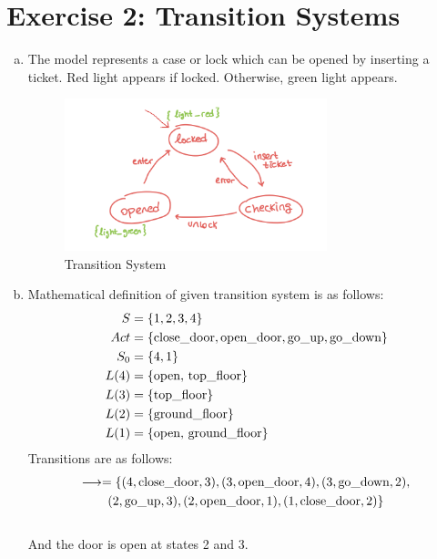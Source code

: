 \documentclass{article}
\begin{document}
\section*{Exercise 2: Transition Systems}
\begin{enumerate}[(a)]
    \item{The model represents a case or lock which can be opened by inserting a ticket. Red light appears if locked. Otherwise, green light appears.}
    \begin{figure}[!htb]
        \centering
        \includegraphics[width=3in]{images/2a.png}
        \caption{Transition System}
        \label{fig:2a}
    \end{figure}

    \item{Mathematical definition of given transition system is as follows:}
        \begin{equation*}
        \centering
            \begin{split}
                S &= \{1,2,3,4\} \\
                Act &= \{\text{close\textunderscore door}, \text{open\textunderscore door}, \text{go\textunderscore up}, \text{go\textunderscore down}\}\\
                S_0 &= \{4, 1\}\\
                L(4) &= \{\text{open, top\textunderscore floor}\}\\
                L(3) &= \{\text{top\textunderscore floor}\}\\
                L(2) &= \{\text{ground\textunderscore floor}\}\\
                L(1) &= \{\text{open, ground\textunderscore floor}\}\\
            \end{split}
        \end{equation*}
        Transitions are as follows:\\
        \begin{multline*}
        \longrightarrow = \{
        (4, \text{close\textunderscore door}, 3), (3, \text{open\textunderscore door}, 4), (3, \text{go\textunderscore down}, 2),\\
        (2, \text{go\textunderscore up}, 3), (2, \text{open\textunderscore door}, 1), (1, \text{close\textunderscore door}, 2)\} 
        \end{multline*}    
        \\
        And the door is open at states 2 and 3.
\end{enumerate}
\end{document}
